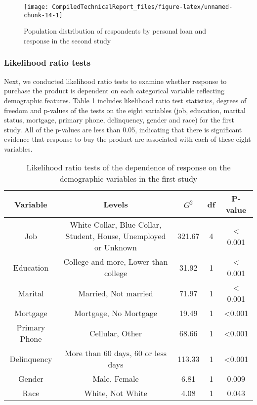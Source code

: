 \documentclass[]{article}
\begin{document}
\begin{figure}

{\centering \texttt{[image: CompiledTechnicalReport\_files/figure-latex/unnamed-chunk-14-1]} 

}

\caption{Population distribution of respondents by personal loan and response in the second study}\label{fig:unnamed-chunk-14}
\end{figure}

\newpage

\hypertarget{likelihood-ratio-tests}{%
\subsubsection{Likelihood ratio tests}\label{likelihood-ratio-tests}}

Next, we conducted likelihood ratio tests to examine whether response to
purchase the product is dependent on each categorical variable
reflecting demographic features. Table 1 includes likelihood ratio test
statistics, degrees of freedom and p-values of the tests on the eight
variables (job, education, marital status, mortgage, primary phone,
delinquency, gender and race) for the first study. All of the p-values
are less than 0.05, indicating that there is significant evidence that
response to buy the product are associated with each of these eight
variables.

\begin{table}[h!]
    \centering
    \begin{tabular}{ |c | c | c | c | c |}
    \hline
        Variable & Levels & \(G^2\) & df & P-value \\ \hline
        Job & White Collar, Blue Collar, Student, House, Unemployed or Unknown & 321.67 & 4 & < 0.001 \\ \hline
        Education & College and more, Lower than college & 31.92 & 1 & < 0.001 \\ \hline
        Marital & Married, Not married & 71.97 & 1 & < 0.001 \\ \hline
        Mortgage & Mortgage, No Mortgage & 19.49 & 1 & <0.001 \\ \hline
        Primary Phone & Cellular, Other & 68.66 & 1 & <0.001 \\ \hline
        Delinquency & More than 60 days, 60 or less days & 113.33 & 1 & <0.001 \\ \hline
        Gender & Male, Female & 6.81 & 1 & 0.009 \\ \hline
        Race & White, Not White & 4.08 & 1 & 0.043 \\ \hline
    \end{tabular}
    \caption{Likelihood ratio tests of the dependence of response on the demographic variables in the first study}
\end{table}
\end{document}
